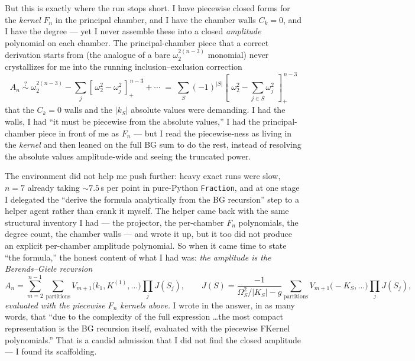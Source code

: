 \documentclass{article}
\newcommand{\pp}[1]{\left[\,#1\,\right]_{+}}
\begin{document}
But this is exactly where the run stops short. I have piecewise closed forms for
the \emph{kernel} $F_n$ in the principal chamber, and I have the chamber walls
$C_k=0$, and I have the degree --- yet I never assemble these into a closed
\emph{amplitude} polynomial on each chamber. The principal-chamber piece that a
correct derivation starts from (the analogue of a bare $\omega_2^{2(n-3)}$
monomial) never crystallizes for me into the running inclusion--exclusion
correction
\[
A_n \;\stackrel{?}{\sim}\; \omega_2^{2(n-3)}-\sum_j\pp{\omega_2^2-\omega_j^2}^{\,n-3}+\cdots
\;=\;\sum_{S}(-1)^{|S|}\pp{\,\omega_2^2-\textstyle\sum_{j\in S}\omega_j^2\,}^{\,n-3}
\]
that the $C_k=0$ walls and the $|k_S|$ absolute values were demanding. I had the
walls, I had ``it must be piecewise from the absolute values,'' I had the
principal-chamber piece in front of me as $F_n$ --- but I read the piecewise-ness
as living in the \emph{kernel} and then leaned on the full BG sum to do the rest,
instead of resolving the absolute values amplitude-wide and seeing the truncated
power.

The environment did not help me push further: heavy exact runs were slow, $n=7$
already taking $\sim7.5$\,s per point in pure-Python \texttt{Fraction}, and at one
stage I delegated the ``derive the formula analytically from the BG recursion''
step to a helper agent rather than crank it myself. The helper came back with the
same structural inventory I had --- the projector, the per-chamber $F_n$
polynomials, the degree count, the chamber walls --- and wrote it up, but it too
did not produce an explicit per-chamber amplitude polynomial. So when it came time
to state ``the formula,'' the honest content of what I had was: \emph{the amplitude
is the Berends--Giele recursion}
\[
A_n=\sum_{m=2}^{n-1}\sum_{\text{partitions}}
V_{m+1}\big(k_1,K^{(1)},\dots\big)\prod_j J(S_j),\qquad
J(S)=\frac{-1}{\Omega_S^2/|K_S|-g}\sum_{\text{partitions}}V_{m+1}\big(-K_S,\dots\big)\prod_j J(S_j),
\]
\emph{evaluated with the piecewise $F_n$ kernels above.} I wrote in the answer, in
as many words, that ``due to the complexity of the full expression \dots the most
compact representation is the BG recursion itself, evaluated with the piecewise
FKernel polynomials.'' That is a candid admission that I did not find the closed
amplitude --- I found its scaffolding.
\end{document}
